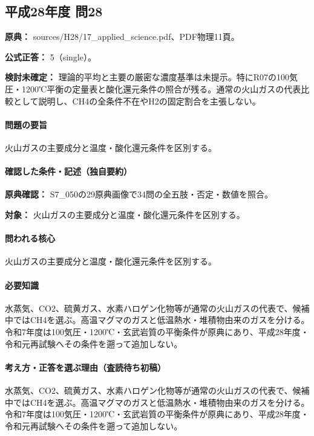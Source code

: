 \subsection{平成28年度 問28}
\label{q:h28-reg-applied-28}

\noindent\textbf{原典：} sources/H28/17\_applied\_science.pdf、PDF物理11頁。

\textbf{公式正答：} 5（single）。

\par\textbf{検討未確定：} 理論的平均と主要の厳密な濃度基準は未提示。特にR07の100気圧・1200℃平衡の定量表と酸化還元条件の照合が残る。通常の火山ガスの代表比較として説明し、CH4の全条件不在やH2の固定割合を主張しない。

\paragraph{問題の要旨} 火山ガスの主要成分と温度・酸化還元条件を区別する。

\paragraph{確認した条件・記述（独自要約）}\mbox{}\par

\noindent\textbf{原典確認：} S7\_050の29原典画像で34問の全五肢・否定・数値を照合。\par

\noindent\textbf{対象：} 火山ガスの主要成分と温度・酸化還元条件を区別する。\par

\paragraph{問われる核心} 火山ガスの主要成分と温度・酸化還元条件を区別する。

\paragraph{必要知識} 水蒸気、CO2、硫黄ガス、水素ハロゲン化物等が通常の火山ガスの代表で、候補中ではCH4を選ぶ。高温マグマのガスと低温熱水・堆積物由来のガスを分ける。令和7年度は100気圧・1200℃・玄武岩質の平衡条件が原典にあり、平成28年度・令和元再試験へその条件を遡って追加しない。

\paragraph{考え方・正答を選ぶ理由（査読待ち初稿）} 水蒸気、CO2、硫黄ガス、水素ハロゲン化物等が通常の火山ガスの代表で、候補中ではCH4を選ぶ。高温マグマのガスと低温熱水・堆積物由来のガスを分ける。令和7年度は100気圧・1200℃・玄武岩質の平衡条件が原典にあり、平成28年度・令和元再試験へその条件を遡って追加しない。

